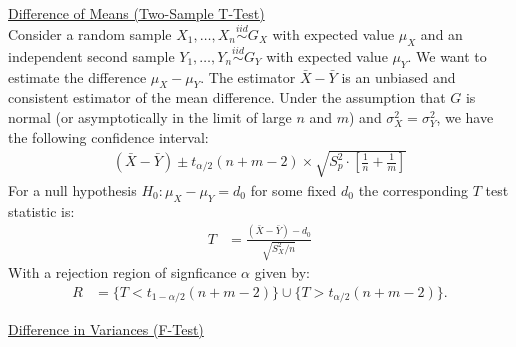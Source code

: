 \documentclass{tufte-handout}
\newcommand{\iid}{\stackrel{iid}{\sim}}
\begin{document}
\newpage

\noindent
\underline{Difference of Means (Two-Sample T-Test)} \\
Consider a random sample $X_1, \ldots, X_n \iid G_X$ with expected
value $\mu_X$ and an independent second sample
$Y_1, \ldots, Y_n \iid G_Y$ with expected value $\mu_Y$. We
want to estimate the difference $\mu_X - \mu_Y$. The estimator
$\bar{X} - \bar{Y}$ is an unbiased and consistent estimator of
the mean difference. Under the assumption that $G$ is normal (or
asymptotically in the limit of large $n$ and $m$) and $\sigma_X^2 = \sigma_Y^2$,
we have the following confidence interval:
\begin{align*}
(\bar{X} - \bar{Y}) \pm t_{\alpha/2}(n+m-2) \times \sqrt{S_p^2 \cdot \left[ \frac{1}{n} + \frac{1}{m} \right]}
\end{align*}
For a null hypothesis $H_0: \mu_X - \mu_Y = d_0$  for some fixed $d_0$
the corresponding $T$ test statistic is:
\begin{align*}
T &= \frac{(\bar{X} - \bar{Y}) - d_0}{\sqrt{S_X^2 / n}}
\end{align*}
With a rejection region of signficance $\alpha$ given by:
\begin{align*}
R &= \{ T < t_{1-\alpha/2}(n+m-2) \} \cup \{ T > t_{\alpha/2}(n+m-2) \}. 
\end{align*}

\vspace*{24pt}

\noindent
\underline{Difference in Variances (F-Test)} \\
\end{document}
